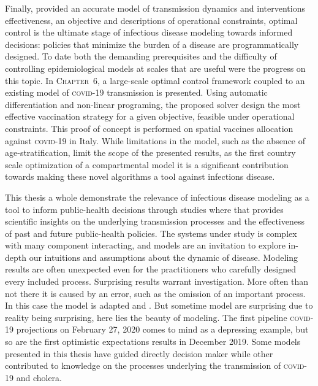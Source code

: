 Finally, provided an accurate model of transmission dynamics and interventions effectiveness, an objective and descriptions of operational constraints, optimal control is the ultimate stage of infectious disease modeling towards informed decisions: policies that minimize the burden of a disease are programmatically designed. To date both the demanding prerequisites and the difficulty of controlling epidemiological models at scales that are useful were the progress on this topic. In \textsc{Chapter~6}, a large-scale optimal control framework coupled to an existing model of \textsc{covid}-19 transmission is presented.  Using automatic differentiation and non-linear programing, the proposed solver design the most effective vaccination strategy for a given objective, feasible under operational constraints. This proof of concept is performed on spatial  vaccines allocation against \textsc{covid}-19 in Italy. While limitations in the model, such as the absence of age-stratification, limit the scope of the presented results, as the first country scale optimization of a compartmental model it is a significant contribution towards making these novel algorithms a tool against infections disease.

This thesis a whole demonstrate the relevance of infectious disease modeling as a tool to inform public-health decisions through studies where that provides scientific insights on the underlying transmission processes and the effectiveness of past and future public-health policies. %
The systems under study is complex with many component interacting, and models are an invitation to explore in-depth our intuitions and assumptions about the dynamic of disease. Modeling results are often unexpected even for the practitioners who carefully designed every included process. Surprising results warrant investigation. More often than not there it is caused by an error, such as the omission of an important process.  In this case the model is adapted and . But sometime model are surprising due to reality being surprising, here lies the beauty of modeling. The first pipeline \textsc{covid}-19 projections on February 27, 2020 comes to mind as a depressing example, but so are the first optimistic expectations results in December 2019. Some models presented in this thesis have guided directly decision maker while other contributed to knowledge on the processes underlying the transmission of \textsc{covid}-19 and cholera.

